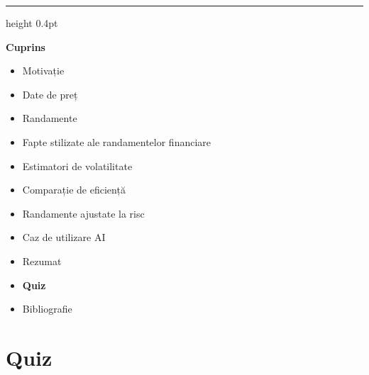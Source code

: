\documentclass[9pt, aspectratio=169, t]{beamer}
\theoremstyle{definition}
\begin{document}
{
\begin{frame}{}
    {\color{FooterGray}\hrule height 0.4pt}
    \vspace{0.1cm}
    {\Large\textcolor{IDAred}{\textbf{Cuprins}}}
    \vspace{0.2cm}
    \begin{itemize}
        \item Motivație \checkmark
        \item Date de preț \checkmark
        \item Randamente \checkmark
        \item Fapte stilizate ale randamentelor financiare \checkmark
        \item Estimatori de volatilitate \checkmark
        \item Comparație de eficiență \checkmark
        \item Randamente ajustate la risc \checkmark
        \item Caz de utilizare AI \checkmark
        \item Rezumat \checkmark
        \item \textbf{Quiz}
        \item Bibliografie
    \end{itemize}
\end{frame}
}

\section{Quiz}
\end{document}

